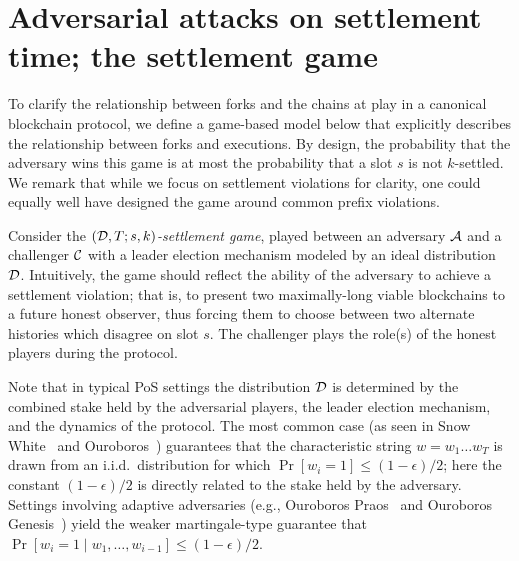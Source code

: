 \section{Adversarial attacks on settlement time; the settlement game}\label{sec:game} 

To clarify the relationship between forks and the chains at play in a
canonical blockchain protocol, we define a game-based model below that
explicitly describes the relationship between forks and executions.
By design, the probability that the adversary wins this game is at
most the probability that a slot $s$ is not $k$-settled. We remark
that while we focus on settlement violations for clarity, one could
equally well have designed the game around common prefix violations.

Consider the \emph{$(\mathcal{D},T;s,k)$-settlement game}, played
between an adversary $\mathcal{A}$ and a challenger $\mathcal{C}$ with
a leader election mechanism modeled by an ideal distribution
$\mathcal{D}$. Intuitively, the game should reflect the ability of
the adversary to achieve a settlement violation; that is, to present
two maximally-long viable blockchains to a future honest observer,
thus forcing them to choose between two alternate histories which
disagree on slot $s$.
The challenger plays the role(s) of the honest players during the
protocol.

Note that in typical PoS settings the distribution $\mathcal{D}$ is
determined by the combined stake held by the adversarial players, the
leader election mechanism, and the dynamics of the protocol. The most
common case (as seen in Snow White~\cite{DBLP:conf/asiacrypt/PassS17}
and Ouroboros~\cite{KRDO17}) guarantees that the characteristic string
$w = w_1 \ldots w_T$ is drawn from an i.i.d.\ distribution for which
$\Pr[w_i = 1] \leq (1 - \epsilon)/2$; here the constant
$(1-\epsilon)/2$ is directly related to the stake held by the
adversary. Settings involving adaptive adversaries (e.g., Ouroboros
Praos~\cite{DBLP:conf/eurocrypt/DavidGKR18} and Ouroboros
Genesis~\cite{DBLP:journals/iacr/BadertscherGKRZ18}) yield the weaker
martingale-type guarantee that
$\Pr[w_i = 1 \mid w_1, \ldots, w_{i-1}] \leq (1 - \epsilon)/2$.


